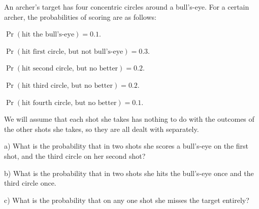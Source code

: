 \documentclass[12pt]{amsart}
\theoremstyle{definition}
\begin{document}
An archer's target has four concentric circles around a bull's-eye. For a certain archer, the probabilities of scoring are as follows:
\begin{compactitem}
\item $\Pr(\text{hit the bull's-eye}) = 0.1$.
\item $\Pr(\text{hit first circle, but not bull's-eye}) = 0.3$.
\item $\Pr(\text{hit second circle, but no better}) = 0.2$.
\item $\Pr(\text{hit third circle, but no better}) = 0.2$.
\item $\Pr(\text{hit fourth circle, but no better}) = 0.1$.
\end{compactitem}
We will assume that each shot she takes has nothing to do with the outcomes of the other shots she takes, so they are all dealt with separately.
\begin{compactitem}
\item[a)] What is the probability that in two shots she scores a bull's-eye on the first shot, and the third circle on her second shot?
\item[b)] What is the probability that in two shots she hits the bull's-eye once and the third circle once.
\item[c)] What is the probability that on any one shot she misses the target entirely?
\end{compactitem}
\end{document}
